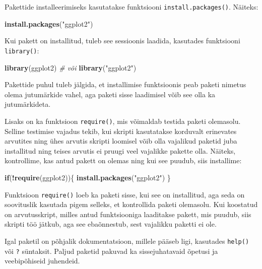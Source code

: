 \documentclass[
]{book}
\newenvironment{Shaded}{\begin{snugshade}}{\end{snugshade}}
\newcommand{\CommentTok}[1]{\textcolor[rgb]{0.56,0.35,0.01}{\textit{#1}}}
\newcommand{\ControlFlowTok}[1]{\textcolor[rgb]{0.13,0.29,0.53}{\textbf{#1}}}
\newcommand{\FunctionTok}[1]{\textcolor[rgb]{0.13,0.29,0.53}{\textbf{#1}}}
\newcommand{\NormalTok}[1]{#1}
\newcommand{\SpecialCharTok}[1]{\textcolor[rgb]{0.81,0.36,0.00}{\textbf{#1}}}
\newcommand{\StringTok}[1]{\textcolor[rgb]{0.31,0.60,0.02}{#1}}
\renewenvironment{Shaded} {\begin{snugshade}\footnotesize} {\end{snugshade}}
\theoremstyle{definition}
\theoremstyle{definition}
\theoremstyle{definition}
\theoremstyle{definition}
\theoremstyle{remark}
\begin{document}
Pakettide installeerimiseks kasutatakse funktsiooni \texttt{install.packages()}. Näiteks:

\begin{Shaded}
\begin{Highlighting}[]
\FunctionTok{install.packages}\NormalTok{(}\StringTok{"ggplot2"}\NormalTok{)}
\end{Highlighting}
\end{Shaded}

Kui pakett on installitud, tuleb see sessioonis laadida, kasutades funktsiooni \texttt{library()}:

\begin{Shaded}
\begin{Highlighting}[]
\FunctionTok{library}\NormalTok{(ggplot2) }
\CommentTok{\# või}
\FunctionTok{library}\NormalTok{(}\StringTok{"ggplot2"}\NormalTok{)}
\end{Highlighting}
\end{Shaded}

Pakettide puhul tuleb jälgida, et installimise funktsioonis peab paketi nimetus olema jutumärkide vahel, aga paketi sisse laadimisel võib see olla ka jutumärkideta.

Lisaks on ka funktsioon \texttt{require()}, mis võimaldab testida paketi olemasolu. Selline testimise vajadus tekib, kui skripti kasutatakse korduvalt erinevates arvutites ning ühes arvutis skripti loomisel võib olla vajalikud paketid juba installitud ning teises arvutis ei pruugi veel vajalikke pakette olla. Näiteks, kontrollime, kas antud pakett on olemas ning kui see puudub, siis installime:

\begin{Shaded}
\begin{Highlighting}[]
\ControlFlowTok{if}\NormalTok{(}\SpecialCharTok{!}\FunctionTok{require}\NormalTok{(ggplot2))\{}
    \FunctionTok{install.packages}\NormalTok{(}\StringTok{"ggplot2"}\NormalTok{)    }
\NormalTok{\}}
\end{Highlighting}
\end{Shaded}

Funktsioon \texttt{require()} loeb ka paketi sisse, kui see on installitud, aga seda on soovituslik kasutada pigem selleks, et kontrollida paketi olemasolu. Kui koostatud on arvutusskript, milles antud funktsiooniga laaditakse pakett, mis puudub, siis skripti töö jätkub, aga see ebaõnnestub, sest vajalikku paketti ei ole.

Igal paketil on põhjalik dokumentatsioon, millele pääseb ligi, kasutades \texttt{help()} või \texttt{?} süntaksit. Paljud paketid pakuvad ka sissejuhatavaid õpetusi ja veebipõhiseid juhendeid.
\end{document}
